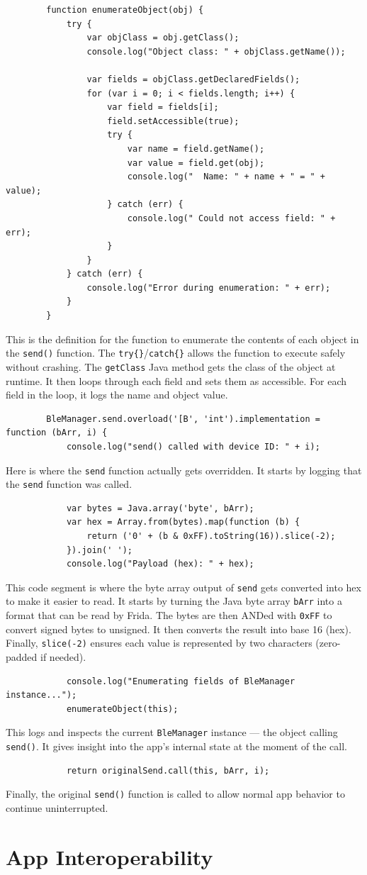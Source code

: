 	\begin{lstlisting}
		function enumerateObject(obj) {
			try {
				var objClass = obj.getClass();
				console.log("Object class: " + objClass.getName());
				
				var fields = objClass.getDeclaredFields();
				for (var i = 0; i < fields.length; i++) {
					var field = fields[i];
					field.setAccessible(true);
					try {
						var name = field.getName();
						var value = field.get(obj);
						console.log("  Name: " + name + " = " + value);
					} catch (err) {
						console.log(" Could not access field: " + err);
					}
				}
			} catch (err) {
				console.log("Error during enumeration: " + err);
			}
		}
	\end{lstlisting}
	This is the definition for the function to enumerate the contents of each object in the \texttt{send()} function. The \texttt{try\{\}}/\texttt{catch\{\}} allows the function to execute safely without crashing. The \texttt{getClass} Java method gets the class of the object at runtime. It then loops through each field and sets them as accessible. For each field in the loop, it logs the name and object value.
	
	\begin{lstlisting}
		BleManager.send.overload('[B', 'int').implementation = function (bArr, i) {
			console.log("send() called with device ID: " + i);
		\end{lstlisting}
		Here is where the \texttt{send} function actually gets overridden. It starts by logging that the \texttt{send} function was called.
		
		\begin{lstlisting}
			var bytes = Java.array('byte', bArr);
			var hex = Array.from(bytes).map(function (b) {
				return ('0' + (b & 0xFF).toString(16)).slice(-2);
			}).join(' ');
			console.log("Payload (hex): " + hex);
		\end{lstlisting}
		This code segment is where the byte array output of \texttt{send} gets converted into hex to make it easier to read. It starts by turning the Java byte array \texttt{bArr} into a format that can be read by Frida. The bytes are then ANDed with \texttt{0xFF} to convert signed bytes to unsigned. It then converts the result into base 16 (hex). Finally, \texttt{slice(-2)} ensures each value is represented by two characters (zero-padded if needed).
		
		\begin{lstlisting}
			console.log("Enumerating fields of BleManager instance...");
			enumerateObject(this);
		\end{lstlisting}
		This logs and inspects the current \texttt{BleManager} instance — the object calling \texttt{send()}. It gives insight into the app’s internal state at the moment of the call.
		
		\begin{lstlisting}
			return originalSend.call(this, bArr, i);
\end{lstlisting}
Finally, the original \texttt{send()} function is called to allow normal app behavior to continue uninterrupted.


\section{App Interoperability}


